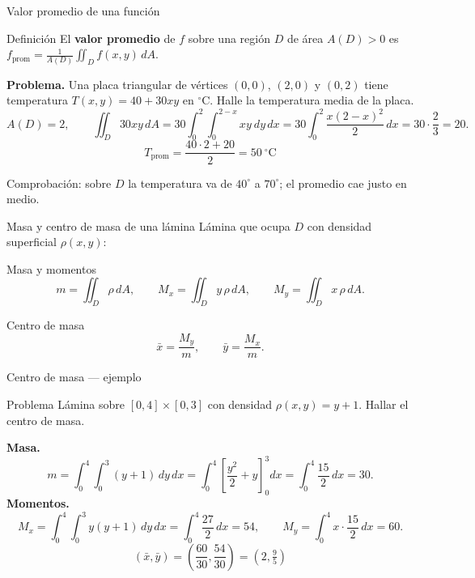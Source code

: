 \documentclass[11pt,aspectratio=169]{beamer}
\begin{document}
\begin{frame}{Valor promedio de una función}
  \begin{block}{Definición}
    El \textbf{valor promedio} de $f$ sobre una región $D$ de área $A(D)>0$ es
    $\displaystyle f_{\text{prom}}=\frac{1}{A(D)}\iint_D f(x,y)\,dA$.
  \end{block}
  \pause
  \textbf{Problema.} Una placa triangular de vértices $(0,0)$, $(2,0)$ y $(0,2)$ tiene temperatura $T(x,y)=40+30xy$ en $^\circ$C. Halle la temperatura media de la placa.
  \pause
  \[
    A(D)=2,
    \qquad
    \iint_D 30xy\,dA=30\int_0^2\!\!\int_0^{2-x}\!\! xy\ dy\,dx
    =30\int_0^2\frac{x(2-x)^2}{2}\,dx=30\cdot\frac23=20.
  \]
  \pause
  \[
    T_{\text{prom}}=\frac{40\cdot2+20}{2}=\boxed{50\ ^\circ\mathrm C}
  \]
  \pause
  \begin{center}\small\color{gray60} Comprobación: sobre $D$ la temperatura va de $40^\circ$ a $70^\circ$; el promedio cae justo en medio. \checkmark\end{center}
\end{frame}

\begin{frame}{Masa y centro de masa de una lámina}
  Lámina que ocupa $D$ con densidad superficial $\rho(x,y)$:
  \begin{block}{Masa y momentos}
    \[
      m=\iint_D \rho\,dA,\qquad
      M_x=\iint_D y\,\rho\,dA,\qquad
      M_y=\iint_D x\,\rho\,dA.
    \]
  \end{block}
  \pause
  \begin{block}{Centro de masa}
    \[
      \bar x = \frac{M_y}{m},\qquad \bar y = \frac{M_x}{m}.
    \]
  \end{block}
  \pause
\end{frame}

\begin{frame}{Centro de masa --- ejemplo}
  \begin{block}{Problema}
    Lámina sobre $[0,4]\times[0,3]$ con densidad $\rho(x,y)=y+1$. Hallar el centro de masa.
  \end{block}
  \pause
  \textbf{Masa.}
  \[
    m=\int_0^4\!\!\int_0^3 (y+1)\,dy\,dx
     =\int_0^4\left[\frac{y^2}{2}+y\right]_0^3 dx
     =\int_0^4 \frac{15}{2}\,dx = 30.
  \]
  \pause
  \textbf{Momentos.}
  \[
    M_x=\int_0^4\!\!\int_0^3 y(y+1)\,dy\,dx=\int_0^4\frac{27}{2}\,dx=54,
    \qquad
    M_y=\int_0^4 x\cdot\frac{15}{2}\,dx = 60.
  \]
  \pause
  \[
    (\bar x,\bar y)=\left(\frac{60}{30},\frac{54}{30}\right)
    = \boxed{\left(2,\tfrac95\right)}
  \]
\end{frame}
\end{document}
